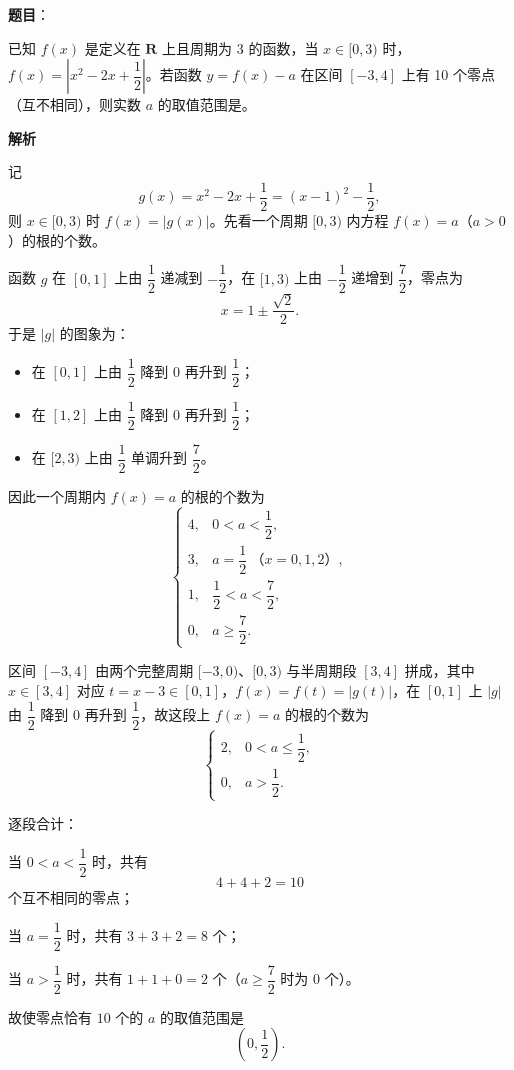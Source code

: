 \begin{answer}

\textbf{题目}：

已知 $f(x)$ 是定义在 $\mathbf R$ 上且周期为 3 的函数，当 $x\in[0,3)$ 时，$f(x)=\left|x^2-2x+\dfrac12\right|$。若函数 $y=f(x)-a$ 在区间 $[-3,4]$ 上有 10 个零点（互不相同），则实数 $a$ 的取值范围是\gkblank{}。

\textbf{解析}

记
\nopagebreak[4]
\[g(x)=x^2-2x+\frac12=(x-1)^2-\frac12,\]
则 $x\in[0,3)$ 时 $f(x)=|g(x)|$。先看一个周期 $[0,3)$ 内方程 $f(x)=a$（$a>0$）的根的个数。

函数 $g$ 在 $[0,1]$ 上由 $\dfrac12$ 递减到 $-\dfrac12$，在 $[1,3)$ 上由 $-\dfrac12$ 递增到 $\dfrac72$，零点为
\nopagebreak[4]
\[x=1\pm\frac{\sqrt2}2.\]
于是 $|g|$ 的图象为：

\begin{itemize}
\item 在 $[0,1]$ 上由 $\dfrac12$ 降到 $0$ 再升到 $\dfrac12$；
\item 在 $[1,2]$ 上由 $\dfrac12$ 降到 $0$ 再升到 $\dfrac12$；
\item 在 $[2,3)$ 上由 $\dfrac12$ 单调升到 $\dfrac72$。
\end{itemize}

因此一个周期内 $f(x)=a$ 的根的个数为
\nopagebreak[4]
\[\begin{cases}
4, & 0<a<\dfrac12,\\[4pt]
3, & a=\dfrac12\ \text{（}x=0,1,2\text{）},\\[4pt]
1, & \dfrac12<a<\dfrac72,\\[4pt]
0, & a\geqslant\dfrac72.
\end{cases}\]

区间 $[-3,4]$ 由两个完整周期 $[-3,0)$、$[0,3)$ 与半周期段 $[3,4]$ 拼成，其中 $x\in[3,4]$ 对应 $t=x-3\in[0,1]$，$f(x)=f(t)=|g(t)|$，在 $[0,1]$ 上 $|g|$ 由 $\dfrac12$ 降到 $0$ 再升到 $\dfrac12$，故这段上 $f(x)=a$ 的根的个数为
\nopagebreak[4]
\[\begin{cases}
2, & 0<a\leqslant\dfrac12,\\
0, & a>\dfrac12.
\end{cases}\]

逐段合计：

当 $0<a<\dfrac12$ 时，共有
\nopagebreak[4]
\[4+4+2=10\]
个互不相同的零点；

当 $a=\dfrac12$ 时，共有 $3+3+2=8$ 个；

当 $a>\dfrac12$ 时，共有 $1+1+0=2$ 个（$a\geqslant\dfrac72$ 时为 $0$ 个）。

故使零点恰有 $10$ 个的 $a$ 的取值范围是
\nopagebreak[4]
\[\left(0,\frac12\right).\]


\end{answer}
